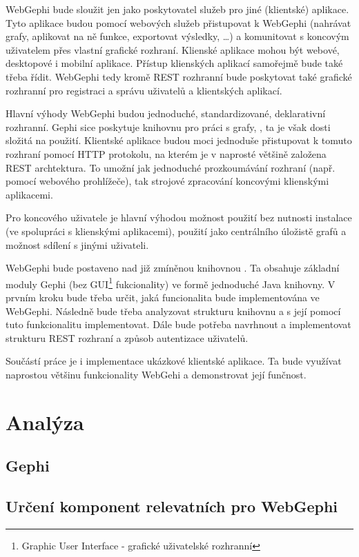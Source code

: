 \documentclass[thesis=B,czech]{FITthesis}[2012/06/26]
\begin{document}
WebGephi bude sloužit jen jako poskytovatel služeb pro jiné (klientské) aplikace. Tyto aplikace budou pomocí webových služeb přistupovat k WebGephi (nahrávat grafy, aplikovat na ně funkce, exportovat výsledky, \ldots)
a komunitovat s koncovým uživatelem přes vlastní grafické rozhraní. Klienské aplikace mohou být webové, desktopové i mobilní aplikace. Přístup klienských aplikací samořejmě bude také třeba řídit. 
WebGephi tedy kromě REST rozhranní bude poskytovat také grafické rozhranní pro registraci a správu uživatelů a klientských aplikací.

Hlavní výhody WebGephi budou jednoduché, standardizované, deklarativní rozhranní. Gephi sice poskytuje knihovnu pro práci s grafy, \cite{gephi:toolkit}, ta je však dosti složitá na použití. 
Klientské aplikace budou moci jednoduše přistupovat k tomuto rozhraní pomocí HTTP protokolu, na kterém je v naprosté většině založena REST archtektura. To umožní jak
jednoduché prozkoumávání rozhraní (např. pomocí webového prohlížeče), tak strojové zpracování koncovými klienskými aplikacemi.

Pro koncového uživatele je hlavní výhodou možnost použití bez nutnosti instalace (ve spolupráci s klienskými aplikacemi), použití jako centrálního úložistě grafů a možnost sdílení s jinými uživateli.

WebGephi bude postaveno nad již zmíněnou knihovnou . Ta obsahuje základní moduly Gephi (bez GUI\footnote{Graphic User Interface - grafické uživatelské rozhranní} fukcionality) ve formě jednoduché Java knihovny.
V prvním kroku bude třeba určit, jaká funcionalita bude implementována ve WebGephi. Následně bude třeba analyzovat strukturu knihovnu  a s její pomocí tuto funkcionalitu implementovat.
Dále bude potřeba navrhnout a implementovat strukturu REST rozhraní a způsob autentizace uživatelů.

Součástí práce je i implementace ukázkové klientské aplikace. Ta bude využívat naprostou většinu funkcionality WebGehi a demonstrovat její funčnost.

\chapter{Analýza}
\section{Gephi}

\section{Určení komponent relevatních pro WebGephi}
\end{document}
